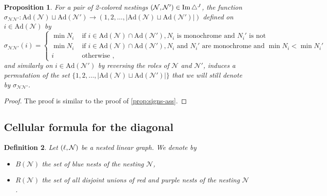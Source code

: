 \documentclass[twoside, 12pt]{amsart}
\newtheorem{definition}{Definition}[section]
\newtheorem{proposition}[definition]{Proposition}
\theoremstyle{remark}
\begin{document}
\begin{proposition} 
\label{prop:signs-mul}
For a pair of 2-colored nestings  $(\mathcal{N},\mathcal{N}')\in \operatorname{Im}\triangle^J$, the function $\sigma_{\mathcal{N}\mathcal{N}'}: \mathrm{Ad}(\mathcal{N})\sqcup \mathrm{Ad}(\mathcal{N}') \to (1,2,\ldots,|\mathrm{Ad}(\mathcal{N})\sqcup \mathrm{Ad}(\mathcal{N}')|)$ defined on $i \in \mathrm{Ad}(\mathcal{N})$ by 
\begin{equation*}
  \sigma_{\mathcal{N}\mathcal{N}'}(i)= 
  \begin{cases}
    \min N_i & \text{ if } i \in \mathrm{Ad}(\mathcal{N})\cap \mathrm{Ad}(\mathcal{N}') , N_i \text{ is monochrome and } N_i' \text{ is not} \\
    \min N_i & \text{ if } i \in \mathrm{Ad}(\mathcal{N})\cap \mathrm{Ad}(\mathcal{N}'), N_i \text{ and } N_i' \text{ are monochrome and } \min N_i < \min N_i' \\ 
    i & \text{ otherwise ,} 
  \end{cases}
\end{equation*}
and similarly on $i \in \mathrm{Ad}(\mathcal{N}')$ by reversing the roles of $\mathcal{N}$ and $\mathcal{N}'$, induces a permutation of the set $\{1,2,\ldots,|\mathrm{Ad}(\mathcal{N})\sqcup \mathrm{Ad}(\mathcal{N}')|\}$ that we will still denote by $\sigma_{\mathcal{N}\mathcal{N}'}$.
\end{proposition}

\begin{proof}
  The proof is similar to the proof of \cref{prop:signs-ass}.
\end{proof}

\subsection{Cellular formula for the diagonal} \label{ss:cellular-formula}

\begin{definition}
Let $(\ell,\mathcal{N})$ be a nested linear graph. We denote by 
\begin{itemize}[leftmargin=*]
  \item $B(\mathcal{N})$ the set of blue nests of the nesting $\mathcal{N}$,
  \item $R(\mathcal{N})$ the set of all disjoint \emph{unions} of red and purple nests of the nesting $\mathcal{N}$.
\end{itemize}
\end{definition}
\end{document}
